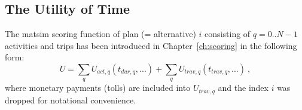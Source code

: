 \subsection{The Utility of Time}
\label{sec:scor-funct-revisited}
The \acrshort{matsim} scoring function of plan (= alternative) $i$ consisting of $q = 0..N-1$ activities and trips has been introduced in Chapter~\ref{ch:scoring} in the following form:\
\begin{equation}
U = \sum_q U_{act,q}(t_{dur,q}, ...) + \sum_q U_{trav,q}(t_{trav,q}, ...) 
%
\ ,
\label{eq:scoring-fct-revisited}
\end{equation}
where monetary payments (\eg tolls) are included into $U_{trav,q}$ and the index $i$ was dropped for notational convenience.


